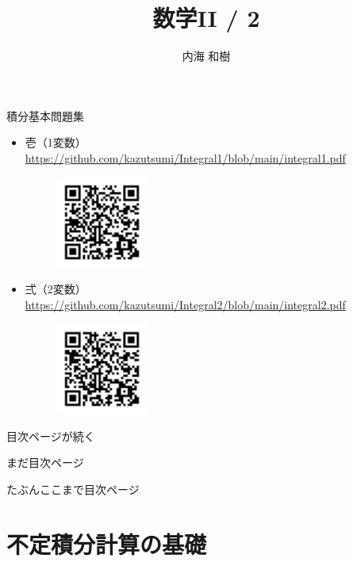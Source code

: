 \documentclass[10pt, uplatex, dvipdfmx]{jsarticle}
\title{\Huge 数学II / 2}
\author{\Large 内海 和樹}
\theoremstyle{definition}
\numberwithin{equation}{section}
\begin{document}
\maketitle

\vspace{5zh}
\begin{center}
  {\LARGE 積分基本問題集}

  \begin{itemize}
    \setlength{\itemsep}{2zh}
    
  \item 壱（1変数） \url{https://github.com/kazutsumi/Integral1/blob/main/integral1.pdf}
    \begin{figure}[h]
      \centering
      \includegraphics[width=3cm]{./pictures/QR/1.png}
    \end{figure}
    
  \item 弍（2変数） \url{https://github.com/kazutsumi/Integral2/blob/main/integral2.pdf}
    \begin{figure}[h]
      \centering
      \includegraphics[width=3cm]{./pictures/QR/2.png}
    \end{figure}
  \end{itemize}
\end{center}


\thispagestyle{empty}

\clearpage

\tableofcontents

\newpage

目次ページが続く

\newpage

まだ目次ページ

\newpage

たぶんここまで目次ページ

\newpage

\section{不定積分計算の基礎}
\end{document}
